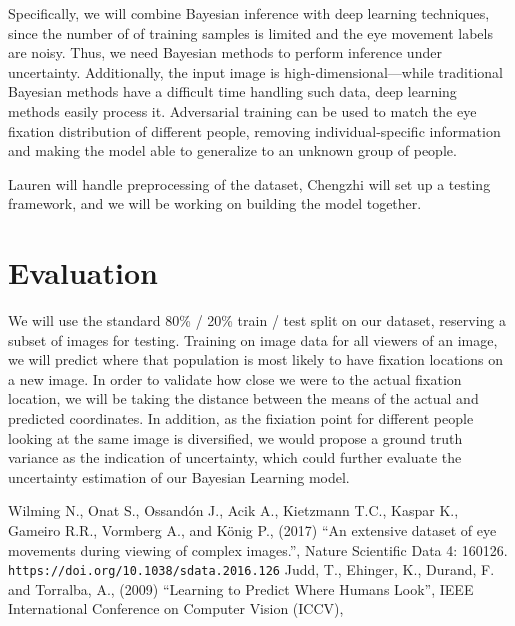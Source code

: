 \documentclass[11pt]{article}
\begin{document}
Specifically, we will combine Bayesian inference with deep learning techniques,
since the number of of training samples is limited and the eye movement labels
are noisy. Thus, we need Bayesian methods to perform inference under
uncertainty. Additionally, the input image is high-dimensional---while
traditional Bayesian methods have a difficult time handling such data, deep
learning methods easily process it.  Adversarial training can be used to match
the eye fixation distribution of different people, removing individual-specific
information and making the model able to generalize to an unknown group of
people.

Lauren will handle preprocessing of the dataset, Chengzhi will set up a testing
framework, and we will be working on building the model together. 
\vspace{-0.5cm}

\section{Evaluation}

We will use the standard 80\% / 20\% train / test split on our dataset,
reserving a subset of images for testing. Training on image data for all
viewers of an image, we will predict where that population is most likely to
have fixation locations on a new image. In order to validate how close we were
to the actual fixation location, we will be taking the distance between the
means of the actual and predicted coordinates. In addition, as the fixiation
point for different people looking at the same image is diversified, we would
propose a ground truth variance as the indication of uncertainty, which could
further evaluate the uncertainty estimation of our Bayesian Learning model.



\vspace{-0.25cm}


\begin{thebibliography}{99}
     Wilming N., Onat S., Ossandón J., Acik A., Kietzmann
    T.C., Kaspar K., Gameiro R.R., Vormberg A., and König P., (2017)
    ``An extensive dataset of eye movements during viewing of complex
    images.'', Nature Scientific Data 4: 160126.  \verb|https://doi.org/10.1038/sdata.2016.126|
      Judd, T., Ehinger, K., Durand, F. and Torralba, A.,
      (2009)
      ``Learning to Predict Where Humans Look'',
      IEEE International Conference on Computer Vision (ICCV),


\end{thebibliography}
\end{document}
